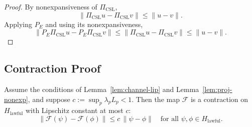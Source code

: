 \documentclass[11pt]{article}
\begin{document}
\begin{proof}
By nonexpansiveness of $\Pi_{\text{CSL}}$,
\[
  \|\Pi_{\text{CSL}} u - \Pi_{\text{CSL}} v\| \le \|u - v\|.
\]
Applying $P_E$ and using its nonexpansiveness,
\[
  \|P_E \Pi_{\text{CSL}} u - P_E \Pi_{\text{CSL}} v\|
  \le \|\Pi_{\text{CSL}} u - \Pi_{\text{CSL}} v\|
  \le \|u - v\|.
\]
\end{proof}

\subsection{Contraction Proof}

\begin{theorem}
\label{thm:F-contraction}
Assume the conditions of Lemma~\ref{lem:channel-lip} and Lemma~\ref{lem:proj-nonexp}, and suppose $c := \sup_p \lambda_p L_p < 1$.
Then the map $\mathcal{F}$ is a contraction on $H_{\text{lawful}}$ with Lipschitz constant at most $c$:
\begin{equation}
  \|\mathcal{F}(\psi) - \mathcal{F}(\phi)\|
  \le c \, \|\psi - \phi\|
  \quad\text{for all } \psi,\phi \in H_{\text{lawful}}.
\end{equation}
\end{theorem}
\end{document}
